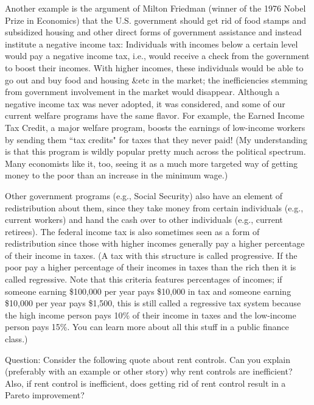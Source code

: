 Another example is the argument of Milton Friedman (winner of the 1976 Nobel Prize in Economics) that the U.S. government should get rid of food stamps and subsidized housing and other direct forms of government assistance and instead institute a negative income tax: Individuals with incomes below a certain level would pay a negative income tax, i.e., would receive a check from the government to boost their incomes. With higher incomes, these individuals would be able to go out and buy food and housing \&etc in the market; the inefficiencies stemming from government involvement in the market would disappear. Although a negative income tax was never adopted, it was considered, and some of our current welfare programs have the same flavor. For example, the Earned Income Tax Credit, a major welfare program, boosts the earnings of low-income workers by sending them ``tax credits" for taxes that they never paid! (My understanding is that this program is wildly popular pretty much across the political spectrum. Many economists like it, too, seeing it as a much more targeted way of getting money to the poor than an increase in the minimum wage.)

Other government programs (e.g., Social Security) also have an element of redistribution about them, since they take money from certain individuals (e.g., current workers) and hand the cash over to other individuals (e.g., current retirees). The federal income tax is also sometimes seen as a form of redistribution since those with higher incomes generally pay a higher percentage of their income in taxes. (A tax with this structure is called progressive. If the poor pay a higher percentage of their incomes in taxes than the rich then it is called regressive. Note that this criteria features percentages of incomes; if someone earning \$100,000 per year pays \$10,000 in tax and someone earning \$10,000 per year pays \$1,500, this is still called a regressive tax system because the high income person pays 10\% of their income in taxes and the low-income person pays 15\%. You can learn more about all this stuff in a public finance class.) 

Question: Consider the following quote about rent controls. Can you explain (preferably with an example or other story) why rent controls are inefficient? Also, if rent control is inefficient, does getting rid of rent control result in a Pareto improvement? 
 
